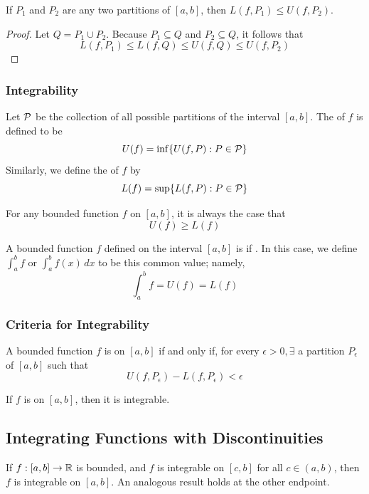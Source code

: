 \documentclass[11pt]{article}
\begin{document}
\lemma If $P_1$ and $P_2$ are any two partitions of $[a,b]$, then $L(f, P_1) \leq U(f, P_2)$.

\begin{proof}
	Let $Q = P_1 \cup P_2$. Because $P_1 \subseteq Q$ and $P_2 \subseteq Q$, it follows that 
	$$L(f, P_1) \leq L(f, Q) \leq U(f,Q) \leq U(f, P_2)$$
	
\end{proof}

\subsubsection{Integrability}

Let $\mathcal{P}$ be the collection of all possible partitions of the interval $[a,b]$. The  of $f$ is defined to be
$$U(f) = \inf\{ U(f,P): P \in \mathcal{P}\}$$
Similarly, we define the  of $f$ by
$$L(f) = \sup\{ L(f,P): P \in \mathcal{P}\}$$

\lemma For any bounded function $f$ on $[a,b]$, it is always the case that $$U(f) \geq L(f)$$

 A bounded function $f$ defined on the interval $[a,b]$ is  if . In this case, we define $\int_a^b f$ or $\int_a^b f(x) \, dx$ to be this common value; namely,
$$\int_a^b f = U(f) = L(f)$$

\subsubsection{Criteria for Integrability}
A bounded function $f$ is  on $[a,b]$ if and only if, for every $\epsilon > 0, \exists$ a partition $P_{\epsilon}$ of $[a,b]$ such that
$$U(f, P_\epsilon) - L(f, P_\epsilon) < \epsilon$$

\theorem If $f$ is  on $[a,b]$, then it is integrable.

\subsection{Integrating Functions with Discontinuities}
\theorem If $f: [a,b] \rightarrow \mathbb{R}$ is bounded, and $f$ is integrable on $[c,b]$ for all $c \in (a,b)$, then $f$ is integrable on $[a,b]$. An analogous result holds at the other endpoint.
\end{document}
